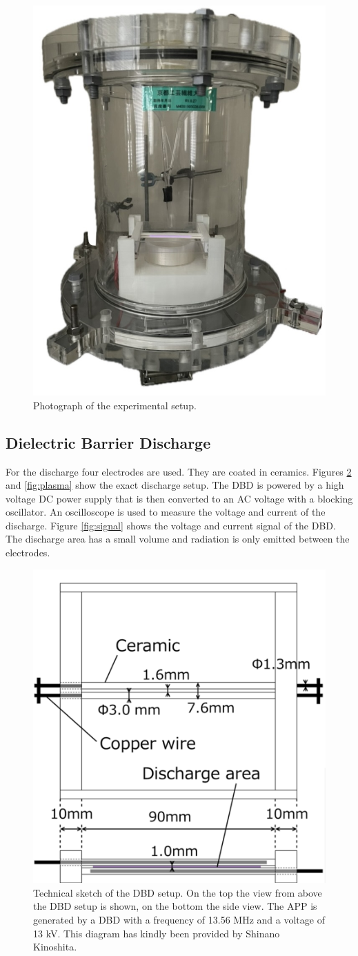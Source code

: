 \begin{figure}
    \centering
    \includegraphics[width=.5\textwidth]{images/Setup_photo.jpeg}
    \caption[Photograph of the setup]{Photograph of the experimental setup.}
    \label{fig:photo}
\end{figure}

\subsection{Dielectric Barrier Discharge}
\label{sec:dbd}
For the discharge four electrodes are used. They are coated in ceramics. Figures \ref{fig:dbd} and \ref{fig:plasma} show the exact discharge setup. The DBD is powered by a high voltage DC power supply that is then converted to an AC voltage with a blocking oscillator. An oscilloscope is used to measure the voltage and current of the discharge. Figure \ref{fig:signal} shows the voltage and current signal of the DBD. The discharge area has a small volume and radiation is only emitted between the electrodes. 
\begin{figure}
    \centering
    \includegraphics[width=.65\textwidth]{images/APP_setup.png}
    \caption[Technical sketch of the DBD setup]{Technical sketch of the DBD setup. On the top the view from above the DBD setup is shown, on the bottom the side view. The APP is generated by a DBD with a frequency of 13.56 MHz and a voltage of 13 kV. This diagram has kindly been provided by Shinano Kinoshita.}
    \label{fig:dbd}
\end{figure}

